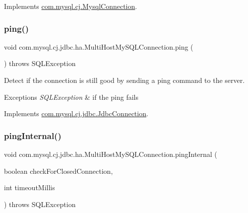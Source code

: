 Implements \mbox{\hyperlink{interfacecom_1_1mysql_1_1cj_1_1_mysql_connection_a15e693e5e3b333c7a29b238b510734ab}{com.\+mysql.\+cj.\+Mysql\+Connection}}.

\mbox{\label{classcom_1_1mysql_1_1cj_1_1jdbc_1_1ha_1_1_multi_host_my_s_q_l_connection_a75f3a66c04a2960e920a6e57a3279556}} 
\subsubsection{\texorpdfstring{ping()}{ping()}}
{\footnotesize\ttfamily void com.\+mysql.\+cj.\+jdbc.\+ha.\+Multi\+Host\+My\+S\+Q\+L\+Connection.\+ping (\begin{DoxyParamCaption}{ }\end{DoxyParamCaption}) throws S\+Q\+L\+Exception}

Detect if the connection is still good by sending a ping command to the server.


\begin{DoxyExceptions}{Exceptions}
{\em S\+Q\+L\+Exception} & if the ping fails \\
\hline
\end{DoxyExceptions}


Implements \mbox{\hyperlink{interfacecom_1_1mysql_1_1cj_1_1jdbc_1_1_jdbc_connection_a6d078258f83ddc438d64bafb0f665004}{com.\+mysql.\+cj.\+jdbc.\+Jdbc\+Connection}}.

\mbox{\label{classcom_1_1mysql_1_1cj_1_1jdbc_1_1ha_1_1_multi_host_my_s_q_l_connection_a491d262b3c772b5b3f9763a82119afed}} 
\subsubsection{\texorpdfstring{ping\+Internal()}{pingInternal()}}
{\footnotesize\ttfamily void com.\+mysql.\+cj.\+jdbc.\+ha.\+Multi\+Host\+My\+S\+Q\+L\+Connection.\+ping\+Internal (\begin{DoxyParamCaption}\item[{boolean}]{check\+For\+Closed\+Connection,  }\item[{int}]{timeout\+Millis }\end{DoxyParamCaption}) throws S\+Q\+L\+Exception}



